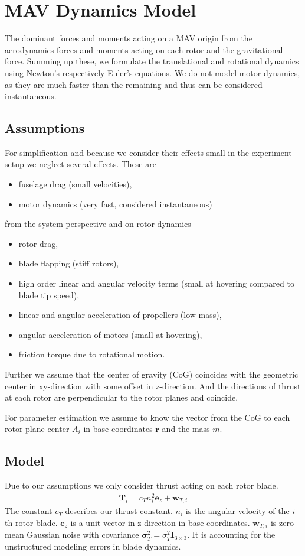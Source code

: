 \documentclass[10pt,a4paper]{article}
\begin{document}
\section{MAV Dynamics Model}
The dominant forces and moments acting on a MAV origin from the aerodynamics forces and moments acting on each rotor and the gravitational force. Summing up these, we formulate the translational and rotational dynamics using Newton's respectively Euler's equations. We do not model motor dynamics, as they are much faster than the remaining and thus can be considered instantaneous.

\subsection*{Assumptions}
For simplification and because we consider their effects small in the experiment setup we neglect several effects. These are 
\begin{itemize} 
\item fuselage drag (small velocities),
\item motor dynamics (very fast, considered instantaneous)
\end{itemize}
from the system perspective and on rotor dynamics
\begin{itemize}
\item rotor drag,
\item blade flapping (stiff rotors),
\item high order linear and angular velocity terms (small at hovering compared to blade tip speed),
\item linear and angular acceleration of propellers (low mass),
\item angular acceleration of motors (small at hovering),
\item friction torque due to rotational motion.
\end{itemize}
Further we assume that the center of gravity (CoG) coincides with the geometric center in xy-direction with some offset in z-direction. And the directions of thrust at each rotor are perpendicular to the rotor planes and coincide.

For parameter estimation we assume to know the vector from the CoG  to each rotor plane center $A_i$ in base coordinates $\mathbf{r}$ and the mass $m$.

\subsection*{Model}
Due to our assumptions we only consider thrust acting on each rotor blade. 
\begin{align}
\mathbf{T}_{i} = c_T n_i^2 \mathbf{e}_z + \mathbf{w}_{T,i}
\end{align}   
The constant $c_T$ describes our thrust constant. $n_i$ is the angular velocity of the $i$-th rotor blade. $\mathbf{e}_z$ is a unit vector in z-direction in base coordinates. $\mathbf{w}_{T,i}$ is zero mean Gaussian noise with covariance $\boldsymbol{\sigma}_T^2 = \sigma_T^2 \mathbf{I}_{3\times3}$. It is accounting for the unstructured modeling errors in blade dynamics.
\end{document}

